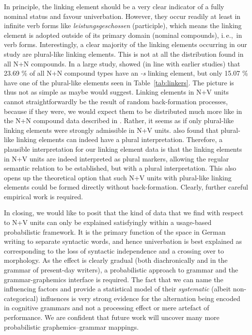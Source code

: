 \documentclass[biblatex, charis, linguex]{glossa}\usepackage{knitr}
\newcommand{\ie}{i.\,e.,\ }
\begin{document}
In principle, the linking element should be a very clear indicator of a fully nominal status and favour univerbation.
However, they occur readily at least in infinite verb forms like \textit{leistungsgeschossen} (participle), which means the linking element is adopted outside of its primary domain (nominal compounds), \ie in verb forms.
Interestingly, a clear majority of the linking elements occurring in our study are plural-like linking elements.
This is not at all the distribution found in all N+N compounds.
In a large study, \mbox{\citet[339]{SchaeferPankratz2018}} showed (in line with earlier studies) that 23.69 \% of all N+N compound types have an \textit{-s} linking element, but only 15.07 \% have one of the plural-like elements seen in Table~\mbox{\ref{tab:linkers}}.
The picture is thus not as simple as maybe \mbox{\citet{Wurzel1998}} would suggest.
Linking elements in N+V units cannot straightforwardly be the result of random back-formation processes, because if they were, we would expect them to be distributed much more like in the N+N compound data described in \mbox{\citet{SchaeferPankratz2018}}.
Rather, it seems as if only plural-like linking elements were strongly admissible in N+V units.
\mbox{\citet{SchaeferPankratz2018}} also found that plural-like linking elements can indeed have a plural interpretation.
Therefore, a plausible interpretation for our linking element data is that the linking elements in N+V units are indeed interpreted as plural markers, allowing the regular semantic relation to be established, but with a plural interpretation.
This also opens up the theoretical option that such N+V units with plural-like linking elements could be formed directly without back-formation.
Clearly, further careful empirical work is required.

In closing, we would like to posit that the kind of data that we find with respect to N+V units can only be explained satisfyingly within a usage-based probabilistic framework.
It is the primary function of the space in German writing to separate syntactic words, and hence univerbation is best explained as corresponding to the loss of syntactic independence and a crossing over to morphology.
As the effect is clearly gradual (both diachronically and in the grammar of present-day writers), a probabilistic approach to grammar and the grammar-graphemics interface is required.
The fact that we can name the influencing factors and provide a statistical model of their \textit{systematic} (albeit non-categorical) influences is very strong evidence for the alternation being encoded in cognitive grammars and not a processing effect or mere artefact of performance.
We are confident that future work will uncover many more probabilistic graphemics--grammar mappings.
\end{document}
